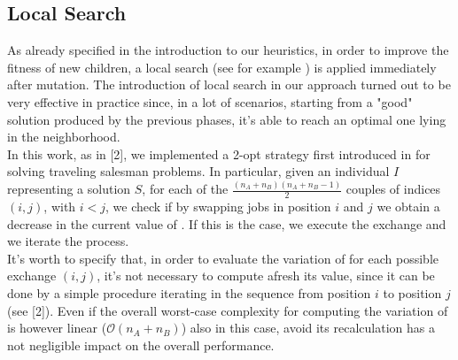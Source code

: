 \documentclass[opre,nonblindrev]{informs3} %
\begin{document}
\subsection{Local Search}
As already specified in the introduction to our heuristics, in order to improve the fitness of new children, a local search (see for example \cite{local}) is applied immediately after mutation. The introduction of local search in our approach turned out to be very effective in practice since, in a lot of scenarios, starting from a "good" solution produced by the previous phases, it's able to reach an optimal one lying in the neighborhood.\\
In this work, as in [2], we implemented a 2-opt strategy first introduced in \cite{2-opt} for solving traveling salesman problems. In particular, given an individual $I$ representing a solution $S$, for each of the $\frac{(n_A+n_B)(n_A+n_B-1)}{2}$ couples of indices $(i,j)$, with $i<j$,  we check if by swapping jobs in position $i$ and $j$ we obtain a decrease in the current value of . If this is the case, we execute the exchange and we iterate the process.\\
It's worth to specify that, in order to evaluate the variation of  for each possible exchange $(i,j)$, it's not necessary to compute afresh its value, since it can be done by a simple procedure iterating in the sequence from position $i$ to position $j$ (see [2]). Even if the overall worst-case complexity for computing the variation of  is however linear ($\mathcal{O}(n_A+n_B)$) also in this case, avoid its recalculation has a not negligible impact on the overall performance.
\end{document}
